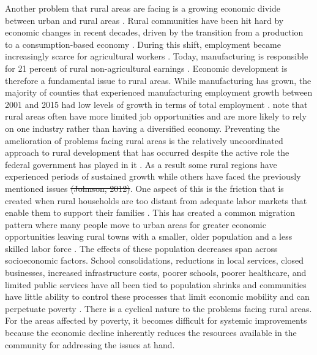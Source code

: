  Another problem that rural areas are facing is a growing economic divide between urban and rural areas \citep{bjerke_mover_2019}.  Rural communities have been hit hard by economic changes in recent decades, driven by the transition from a production to a consumption-based economy \citep{pendall_future_2016}. During this shift, employment became increasingly scarce for agricultural workers \citep{kropczynski_insights_2012}. Today, manufacturing is responsible for 21 percent of rural non-agricultural earnings \citep{low_rural_2017}. Economic development is therefore a fundamental issue to rural areas. While manufacturing has grown, the majority of counties that experienced manufacturing employment growth between 2001 and 2015 had low levels of growth in terms of total employment \citep{low_rural_2017}. \citep{blank_poverty_2005} note that rural areas often have more limited job opportunities and are more likely to rely on one industry rather than having a diversified economy. Preventing the amelioration of problems facing rural areas is the relatively uncoordinated approach to rural development that has occurred despite the active role the federal government has played in it \citep{wilson_rural_2016}. As a result some rural regions have experienced periods of sustained growth while others have faced the previously mentioned issues \sout{(Johnson, 2012)}. One aspect of this is the friction that is created when rural households are too distant from adequate labor markets that enable them to support their families \citep{sparks_poverty_2013}. This has created a common migration pattern where many people move to urban areas for greater economic opportunities leaving rural towns with a smaller, older population and a less skilled labor force \citep{bjerke_mover_2019}. The effects of these population decreases span across socioeconomic factors. School consolidations, reductions in local services, closed businesses, increased infrastructure costs, poorer schools, poorer healthcare, and limited public services have all been tied to population shrinks and communities have little ability to control these processes that limit economic mobility and can perpetuate poverty \citep{martinez_rural_2021}. There is a cyclical nature to the problems facing rural areas. For the areas affected by poverty, it becomes difficult for systemic improvements because the economic decline inherently reduces the resources available in the community for addressing the issues at hand.

